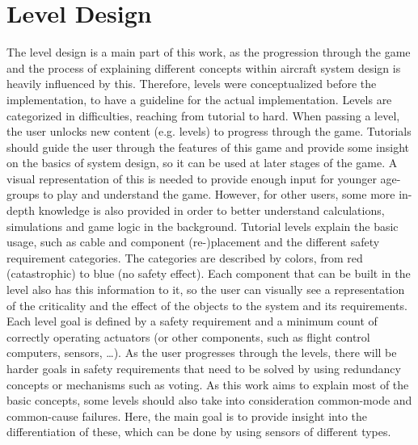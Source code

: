 \section{Level Design}\label{sec:level-design}
The level design is a main part of this work, as the progression through the game and the process of explaining different concepts
within aircraft system design is heavily influenced by this.
Therefore, levels were conceptualized before the implementation, to have a guideline for the actual implementation.
Levels are categorized in difficulties, reaching from tutorial to hard.
When passing a level, the user unlocks new content (e.g. levels) to progress through the game.
Tutorials should guide the user through the features of this game and provide some insight on the basics of system design, so
it can be used at later stages of the game.
A visual representation of this is needed to provide enough input for younger age-groups to play and understand the game.
However, for other users, some more in-depth knowledge is also provided in order to better understand calculations, simulations and
game logic in the background.
Tutorial levels explain the basic usage, such as cable and component (re-)placement and the different safety requirement
categories.
The categories are described by colors, from red (catastrophic) to blue (no safety effect).
Each component that can be built in the level also has this information to it, so the user can visually see a representation
of the criticality and the effect of the objects to the system and its requirements.
Each level goal is defined by a safety requirement and a minimum count of correctly operating actuators (or other components, such
as flight control computers, sensors, \ldots).
As the user progresses through the levels, there will be harder goals in safety requirements that need to be solved by using
redundancy concepts or mechanisms such as voting.
As this work aims to explain most of the basic concepts, some levels should also take into consideration common-mode and common-cause
failures.
Here, the main goal is to provide insight into the differentiation of these, which can be done by using sensors of different types.

\\ \\

